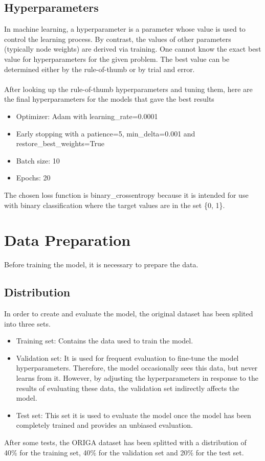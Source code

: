 \documentclass[11pt, a4paper]{article}
\begin{document}
\subsection{Hyperparameters}
In machine learning, a hyperparameter is a parameter whose value is used to control the learning process. By contrast, the values of other parameters (typically node weights) are derived via training. One cannot know the exact best value for hyperparameters for the given problem. The best value can be determined either by the rule-of-thumb or by trial and error. 
\\\\
After looking up the rule-of-thumb hyperparameters and tuning them, here are the final hyperparameters for the models that gave the best results
\begin{itemize}
    \item Optimizer: Adam with learning\_rate=0.0001
    \item Early stopping with a patience=5, min\_delta=0.001 and restore\_best\_weights=True
    \item Batch size: 10
    \item Epochs: 20
\end{itemize}
The chosen loss function is binary\_crossentropy because it is intended for use with binary classification where the target values are in the set \{0, 1\}. 

\section{Data Preparation}
Before training the model, it is necessary to prepare the data.
\subsection{Distribution}
In order to create and evaluate the model, the original dataset has been splited into three sets.
\begin{itemize}
    \item Training set: Contains the data used to train the model.
    \item Validation set: It is used for frequent evaluation to fine-tune the model hyperparameters. Therefore, the model occasionally sees this data, but never learns from it. However, by adjusting the hyperparameters in response to the results of evaluating these data, the validation set indirectly affects the model.
    \item Test set: This set it is used to evaluate the model once the model has been completely trained and provides an unbiased evaluation.
\end{itemize}
After some tests, the ORIGA dataset has been splitted with a distribution of 40\% for the training set, 40\% for the validation set and 20\% for the test set. 
\end{document}
